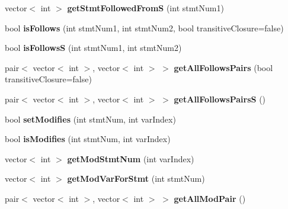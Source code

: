 \begin{DoxyCompactItemize}
\item 
\hypertarget{class_p_k_b_a31949bbf77cb4fbb25ba61df9089c3cf}{}vector$<$ int $>$ {\bfseries get\+Stmt\+Followed\+From\+S} (int stmt\+Num1)\label{class_p_k_b_a31949bbf77cb4fbb25ba61df9089c3cf}

\item 
\hypertarget{class_p_k_b_ad1383cdcf44c16742f7fac193d1be88b}{}bool {\bfseries is\+Follows} (int stmt\+Num1, int stmt\+Num2, bool transitive\+Closure=false)\label{class_p_k_b_ad1383cdcf44c16742f7fac193d1be88b}

\item 
\hypertarget{class_p_k_b_ad068fa67294fffe6956a58faff7d7060}{}bool {\bfseries is\+Follows\+S} (int stmt\+Num1, int stmt\+Num2)\label{class_p_k_b_ad068fa67294fffe6956a58faff7d7060}

\item 
\hypertarget{class_p_k_b_ae2cbd8cb8db3c3cad69b4070fde46a26}{}pair$<$ vector$<$ int $>$, vector$<$ int $>$ $>$ {\bfseries get\+All\+Follows\+Pairs} (bool transitive\+Closure=false)\label{class_p_k_b_ae2cbd8cb8db3c3cad69b4070fde46a26}

\item 
\hypertarget{class_p_k_b_abe5c1609a12ca53ef704780354695c6a}{}pair$<$ vector$<$ int $>$, vector$<$ int $>$ $>$ {\bfseries get\+All\+Follows\+Pairs\+S} ()\label{class_p_k_b_abe5c1609a12ca53ef704780354695c6a}

\item 
\hypertarget{class_p_k_b_a5e20c40fe38f091d852db45244b9fad5}{}bool {\bfseries set\+Modifies} (int stmt\+Num, int var\+Index)\label{class_p_k_b_a5e20c40fe38f091d852db45244b9fad5}

\item 
\hypertarget{class_p_k_b_a4f0ae22beb83a19c9a830e2257c9bc93}{}bool {\bfseries is\+Modifies} (int stmt\+Num, int var\+Index)\label{class_p_k_b_a4f0ae22beb83a19c9a830e2257c9bc93}

\item 
\hypertarget{class_p_k_b_af44fd9ae4269e60bf79fa6f705272f75}{}vector$<$ int $>$ {\bfseries get\+Mod\+Stmt\+Num} (int var\+Index)\label{class_p_k_b_af44fd9ae4269e60bf79fa6f705272f75}

\item 
\hypertarget{class_p_k_b_a8820ded0f372ac3917cbc2456efde382}{}vector$<$ int $>$ {\bfseries get\+Mod\+Var\+For\+Stmt} (int stmt\+Num)\label{class_p_k_b_a8820ded0f372ac3917cbc2456efde382}

\item 
\hypertarget{class_p_k_b_ac1344c37e86afe1895969b527d194be3}{}pair$<$ vector$<$ int $>$, vector$<$ int $>$ $>$ {\bfseries get\+All\+Mod\+Pair} ()\label{class_p_k_b_ac1344c37e86afe1895969b527d194be3}


\end{DoxyCompactItemize}
